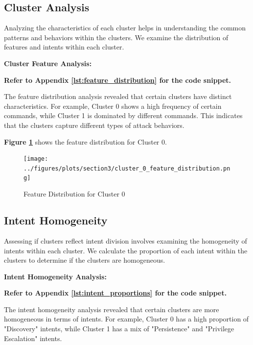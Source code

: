     \subsection{Cluster Analysis}
    
        Analyzing the characteristics of each cluster helps in understanding the common patterns and behaviors within the clusters. We examine the distribution of features and intents within each cluster.

        \textbf{Cluster Feature Analysis:}
        
        \vspace{0.5em}

        \textbf{Refer to Appendix \ref{lst:feature_distribution} for the code snippet.}

        The feature distribution analysis revealed that certain clusters have distinct characteristics. For example, Cluster 0 shows a high frequency of certain commands, while Cluster 1 is dominated by different commands. This indicates that the clusters capture different types of attack behaviors.

        \textbf{Figure \ref{fig:cluster-feature-distribution}} shows the feature distribution for Cluster 0.

        \begin{figure}[h]
            \centering
            \texttt{[image: ../figures/plots/section3/cluster\_0\_feature\_distribution.png]}
            \caption{Feature Distribution for Cluster 0}
            \label{fig:cluster-feature-distribution}
        \end{figure}

    \subsection{Intent Homogeneity}
    
        Assessing if clusters reflect intent division involves examining the homogeneity of intents within each cluster. We calculate the proportion of each intent within the clusters to determine if the clusters are homogeneous.

        \textbf{Intent Homogeneity Analysis:}
        
        \vspace{0.5em}

        \textbf{Refer to Appendix \ref{lst:intent_proportions} for the code snippet.}

        The intent homogeneity analysis revealed that certain clusters are more homogeneous in terms of intents. For example, Cluster 0 has a high proportion of "Discovery" intents, while Cluster 1 has a mix of "Persistence" and "Privilege Escalation" intents.

